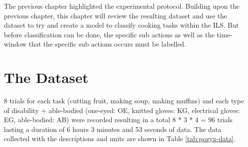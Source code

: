
The previous chapter highlighted the experimental protocol. Building upon the previous chapter, this chapter will review the resulting dataset and use the dataset to try and create a model to classify cooking tasks within the ILS. But before classification can be done, the specific sub actions as well as the time-window that the specific sub actions occurs must be labelled. 

\section{The Dataset}

8 trials for each task (cutting fruit, making soup, making muffins) and each type of disability + able-bodied (one-eyed: OE, knitted gloves: KG, electrical gloves: EG, able-bodied: AB) were recorded resulting in a total 8 * 3 * 4 = 96 trials lasting a duration of 6 hours 3 minutes and 53 seconds of data. The data collected with the descriptions and units are shown in Table \ref{tab:pozyx-data}.

